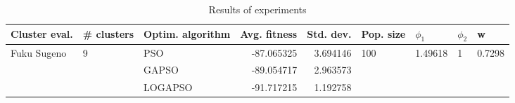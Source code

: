 \begin{table}
\centering
\caption{Results of experiments}
\begin{tabular}{lllrrllll}
\toprule
               Cluster eval. &        \# clusters & Optim. algorithm &  Avg. fitness &  Std. dev. &            Pop. size &               $\phi_{1}$ &         $\phi_{2}$ &                       w \\
\midrule
\multirow{3}{*}{Fuku Sugeno} & \multirow{3}{*}{9} &              PSO &    -87.065325 &   3.694146 & \multirow{3}{*}{100} & \multirow{3}{*}{1.49618} & \multirow{3}{*}{1} & \multirow{3}{*}{0.7298} \\
                             &                    &            GAPSO &    -89.054717 &   2.963573 &                      &                          &                    &                         \\
                             &                    &          LOGAPSO &    -91.717215 &   1.192758 &                      &                          &                    &                         \\
\bottomrule
\end{tabular}
\end{table}
